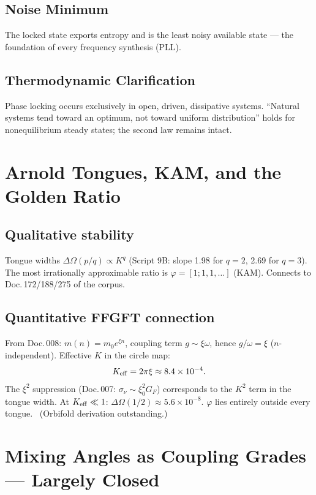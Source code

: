 \subsection{Noise Minimum}
The locked state exports entropy and is the least noisy available state —
the foundation of every frequency synthesis (PLL).

\subsection{Thermodynamic Clarification}
Phase locking occurs exclusively in open, driven, dissipative systems. ``Natural
systems tend toward an optimum, not toward uniform distribution'' holds for
nonequilibrium steady states; the second law remains intact.

\section{Arnold Tongues, KAM, and the Golden Ratio}

\subsection{Qualitative stability \E}
Tongue widths $\Delta\Omega(p/q)\propto K^q$ (Script 9B: slope 1.98 for $q=2$,
2.69 for $q=3$). The most irrationally approximable ratio is $\varphi=[1;1,1,\ldots]$
(KAM). Connects to Doc.\,172/188/275 of the corpus.

\subsection{Quantitative FFGFT connection \K}
From Doc.\,008: $m(n)=m_0 e^{\xi n}$, coupling term $g\sim\xi\omega$, hence
$g/\omega=\xi$ ($n$-independent). Effective $K$ in the circle map:
\begin{equation}
  K_{\mathrm{eff}} = 2\pi\xi \approx 8.4\times10^{-4}.
\end{equation}
The $\xi^2$ suppression (Doc.\,007: $\sigma_\nu\sim\xi_0^2 G_F$) corresponds to the
$K^2$ term in the tongue width. At $K_{\mathrm{eff}}\ll1$:
$\Delta\Omega(1/2)\approx 5.6\times10^{-8}$.
$\varphi$ lies entirely outside every tongue. \K\ (Orbifold derivation outstanding.)

\section{Mixing Angles as Coupling Grades — Largely Closed}

